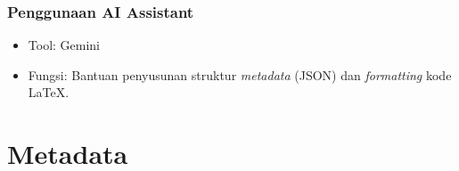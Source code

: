 \documentclass[11pt,a4paper,oneside]{report}
\begin{document}
\subsection*{Penggunaan AI Assistant}
\begin{itemize}
    \item Tool: Gemini
    \item Fungsi: Bantuan penyusunan struktur \textit{metadata} (JSON) dan \textit{formatting} kode LaTeX.
\end{itemize}


\appendix

\chapter{Metadata}
\end{document}
